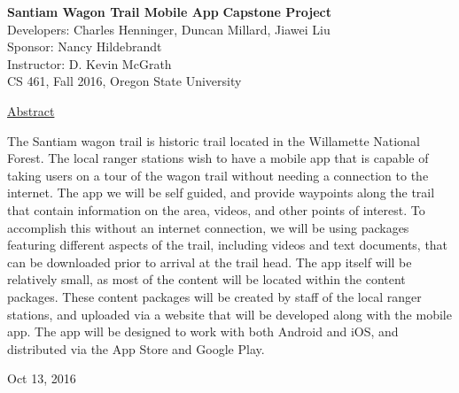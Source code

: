 \documentclass[letterpaper,10pt,titlepage]{article}
\begin{document}
\begin{titlepage}
\begin{center}
    \Huge
    \textbf{Santiam Wagon Trail Mobile App}
    \textbf{Capstone Project}\\
    \vspace{1.0cm}
    \large
    Developers: Charles Henninger, Duncan Millard, Jiawei Liu\\
    Sponsor: Nancy Hildebrandt\\
    \vspace{1.5cm}
    \large
    Instructor: D. Kevin McGrath\\

    \large
    CS 461, Fall 2016, Oregon State University\\
    
    \vspace{0.5cm}

    \vspace{2.5cm}
    \large
    \underline{Abstract}\\
    \vspace{0.3cm}
    \end{center}
    \large
    
    The Santiam wagon trail is historic trail located in the Willamette National Forest. The local ranger stations wish to have a mobile app that is capable of taking users on a tour of the wagon trail without needing a connection to the internet. The app we will be self guided, and provide waypoints along the trail that contain information on the area, videos, and other points of interest. To accomplish this without an internet connection, we will be using packages featuring different aspects of the trail, including videos and text documents, that can be downloaded prior to arrival at the trail head. The app itself will be relatively small, as most of the content will be located within the content packages.  These content packages will be created by staff of the local ranger stations, and uploaded via a website that will be developed along with the mobile app. The app will be designed to work with both Android and iOS, and distributed via the App Store and Google Play.


    
    \vspace{0.8cm}
    \vfill
    
\begin{center}    
    Oct 13, 2016

\end{center}
\end{titlepage}
\end{document}
